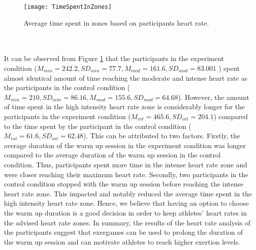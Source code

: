 \begin{figure}[h]
    \centering
    \texttt{[image: TimeSpentInZones]}
    \caption{Average time spent in zones based on participants heart rate.}
    \label{fig:zonesTime}
\end{figure}\\\\
It can be observed from Figure  \ref{fig:zonesTime} that the participants in the experiment condition (\begin{math} M_{min}=242.2, SD_{min}=77.7, M_{mod}=161.6 , SD_{mod}=83.001 \end{math} ) spent almost identical amount of time reaching the moderate and intense heart rate as the participants in the control condition (\begin{math}  M_{min}=210 , SD_{min}=86.16, M_{mod}=155.6 , SD_{mod}=64.68 \end{math}). However, the amount of time spent in the high intensity heart rate zone is considerably longer for the participants in the experiment condition (\begin{math}  M_{int}=465.6 , SD_{int}=204.1\end{math}) compared to the time spent by the participant in the control condition (\begin{math}M_{int}=61.6 , SD_{int}=62.48 \end{math}). This can be attributed to two factors. Firstly, the average duration of the warm up session in the experiment condition was longer compared to the average duration of the warm up session in the control condition. Thus, participants spent more time in the intense heart rate zone and were closer reaching their maximum heart rate. Secondly, two participants in the control condition stopped with the warm up session before reaching the intense heart rate zone. This impacted and notably reduced the average time spent in the high intensity heart rate zone. Hence, we believe that having an option to choose the warm up duration is a good decision in order to keep athletes' heart rates in the advised heart rate zones. In summary, the results of the heart rate analysis of the participants suggest that exergames can be used to prolong the duration of the warm up session and can motivate athletes to reach higher exertion levels. 
